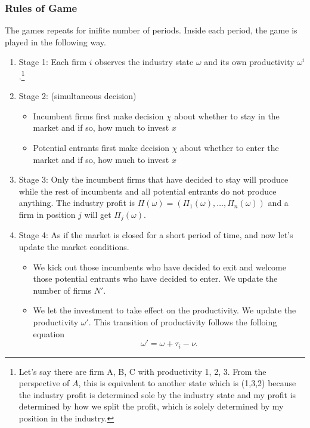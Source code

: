 \documentclass[12pt]{article}[margin=1in]
\begin{document}
\subsubsection{Rules of Game} The games repeats for inifite number of periods. Inside each period, the game is played in the following way.
\begin{enumerate}
    \item Stage 1: Each firm $i$ observes the industry state $\omega$ and its own productivity $\omega^i$.\footnote{Let's say there are firm A, B, C with productivity 1, 2, 3. From the perspective of $A$, this is equivalent to another state which is (1,3,2) because the industry profit is determined sole by the industry state and my profit is determined by how we split the profit, which is solely determined by my position in the industry.}
    \item Stage 2: (simultaneous decision)
    \begin{itemize}
        \item Incumbent firms first make decision $\chi$ about whether to stay in the market and if so, how much to invest $x$
        \item Potential entrants first make decision $\chi$ about whether to enter the market and if so, how much to invest $x$
    \end{itemize}
    \item Stage 3: Only the incumbent firms that have decided to stay will produce while the rest of incumbents and all potential entrants do not produce anything. The industry profit is $\Pi(\omega)=(\Pi_1(\omega),\ldots,\Pi_n(\omega))$ and a firm in position $j$ will get $\Pi_j(\omega)$.
    \item Stage 4: As if the market is closed for a short period of time, and now let's update the market conditions.
    \begin{itemize}
        \item We kick out those incumbents who have decided to exit and welcome those potential entrants who have decided to enter. We update the number of firms $N'$. 
        \item We let the investment to take effect on the productivity. We update the productivity $\omega'$. This transition of productivity follows the folloing equation $$\omega'=\omega+\tau_i-\nu.$$ 
    \end{itemize}
\end{enumerate}
\end{document}
